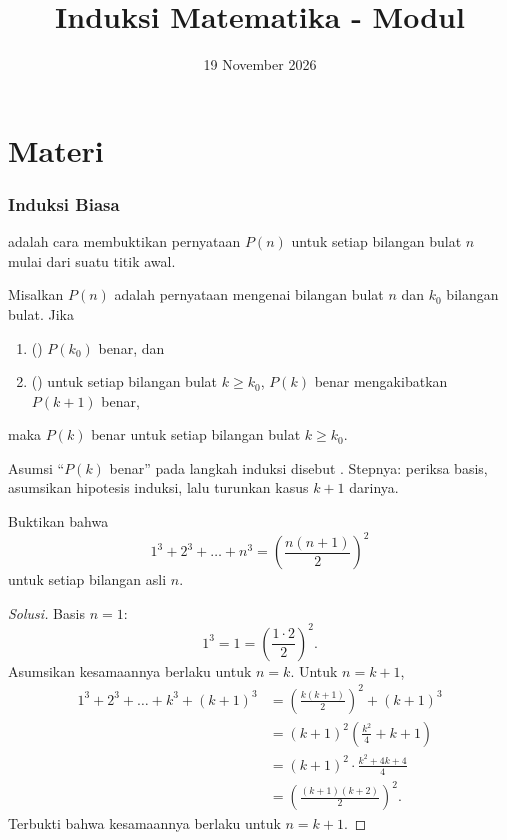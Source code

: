 \documentclass[12pt]{scrartcl}
\title{Induksi Matematika - Modul}
\date{19 November 2026}
\begin{document}
\maketitle

\renewcommand*\contentsname{Daftar Isi}
\tableofcontents

\newpage

\part*{Materi}
\section{Induksi Biasa}

 adalah cara membuktikan
pernyataan $P(n)$ untuk setiap bilangan bulat $n$ mulai dari suatu titik awal.

\begin{theorem}
Misalkan $P(n)$ adalah pernyataan mengenai bilangan bulat $n$
dan $k_0$ bilangan bulat. Jika
\begin{enumerate}
    \item () $P(k_0)$ benar, dan
    \item () untuk setiap bilangan bulat $k \ge k_0$,
    $P(k)$ benar mengakibatkan $P(k+1)$ benar,
\end{enumerate}
maka $P(k)$ benar untuk setiap bilangan bulat $k \ge k_0$.
\end{theorem}

Asumsi ``$P(k)$ benar'' pada langkah induksi disebut
.
Stepnya: periksa basis, asumsikan hipotesis induksi,
lalu turunkan kasus $k+1$ darinya.

\begin{example}
Buktikan bahwa
\[ 1^3 + 2^3 + \dots + n^3 = \left(\frac{n(n+1)}{2}\right)^2 \]
untuk setiap bilangan asli $n$.
\end{example}
\begin{proof}[Solusi]
Basis $n = 1$:
\[ 1^3 = 1 = \left(\frac{1 \cdot 2}{2}\right)^2. \]
Asumsikan kesamaannya berlaku untuk $n = k$. Untuk $n = k+1$,
\begin{align*}
1^3 + 2^3 + \dots + k^3 + (k+1)^3 &= \left(\frac{k(k+1)}{2}\right)^2 + (k+1)^3 \\
&= (k+1)^2\left(\frac{k^2}{4} + k + 1\right) \\
&= (k+1)^2 \cdot \frac{k^2 + 4k + 4}{4} \\
&= \left(\frac{(k+1)(k+2)}{2}\right)^2.
\end{align*}
Terbukti bahwa kesamaannya berlaku untuk $n = k+1$.
\end{proof}
\end{document}
